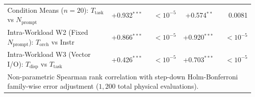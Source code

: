 \begin{table}[t]
\begin{tabular}{l r r r r}
Condition Means ($n=20$): $T_{\text{task}}$ vs $N_{\text{prompt}}$ & +0.932$^{***}$ & $< 10^{-5}$ & +0.574$^{**}$ & 0.0081 \\
Intra-Workload W2 (Fixed $N_{\text{prompt}}$): $T_{\text{orch}}$ vs Instr & +0.866$^{***}$ & $< 10^{-5}$ & +0.920$^{***}$ & $< 10^{-5}$ \\
Intra-Workload W3 (Vector I/O): $T_{\text{disp}}$ vs $T_{\text{task}}$ & +0.426$^{***}$ & $< 10^{-5}$ & +0.703$^{***}$ & $< 10^{-5}$ \\
\hline
\multicolumn{5}{l}{\footnotesize Non-parametric Spearman rank correlation with step-down Holm-Bonferroni family-wise error adjustment ($1{,}200$ total physical evaluations).} \\
\hline
\end{tabular}
\end{table}
